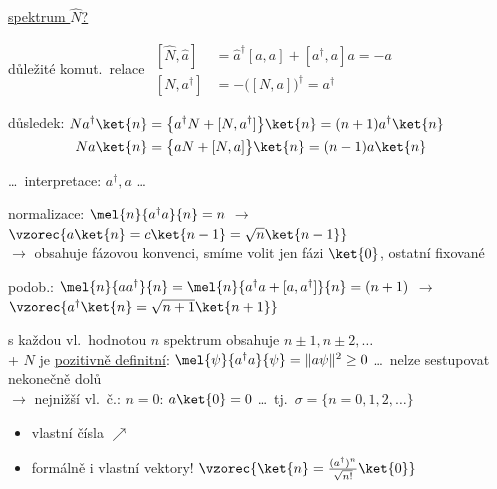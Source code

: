 \underline{spektrum $\hat N$?}

\begin{minipage}{0.68\textwidth}
důležité komut.\ relace \quad
$\begin{aligned}
  [\hat N,\hat a] &= \hat a^\dagger[a,a] + [a^\dagger,a]a = -a \\
  [N,a^\dagger] &= -\big([N,a]\big)^\dagger = a^\dagger
\end{aligned}$
\end{minipage}
\begin{minipage}{0.3\textwidth}
\end{minipage}

důsledek: \quad
$\begin{aligned}[t]
  Na^\dagger\ket{n} &= \big\{a^\dagger N + [N,a^\dagger]\big\}\ket{n} = (n+1)a^\dagger\ket{n} \\
  Na\ket{n} &= \big\{aN + [N,a]\big\}\ket{n} = (n-1)a\ket{n}
\end{aligned}$

\dots\ interpretace: \quad $a^\dagger, a$ \dots\ 

normalizace: \quad $\mel{n}{a^\dagger a}{n} = n$ \quad $\to$ \quad $\vzorec{a\ket{n} = c\ket{n-1} = \sqrt n\ket{n-1}}$ \\
\quad {} $\to$ obsahuje fázovou konvenci, smíme volit jen fázi $\ket{0}$, ostatní fixované

podob.: \quad $\mel{n}{aa^\dagger}{n} = \mel{n}{a^\dagger a + [a,a^\dagger]}{n} = (n+1)$ \quad
$\to$ \quad $\vzorec{a^\dagger\ket{n} = \sqrt{n+1}\ket{n+1}}$

s každou vl.\ hodnotou $n$ spektrum obsahuje $n\pm1, n\pm2, \dots$ \\
\quad + $N$ je \underline{pozitivně definitní}: $\mel{\psi}{a^\dagger a}{\psi} = \|a\psi\|^2 \geq 0$ \dots\ nelze sestupovat nekonečně dolů \\
\quad $\to$ nejnižší vl.\ č.: $n = 0$: \quad $a\ket{0} = 0$ \quad \dots\ tj.\ $\sigma = \{n = 0,1,2,\dots\}$
\begin{itemize}[nosep]
  \item vlastní čísla $\nearrow$
  \item formálně i vlastní vektory! \quad $\vzorec{\ket{n} = \frac{(a^\dagger)^n}{\sqrt{n!}}\ket{0}}$
\end{itemize}

